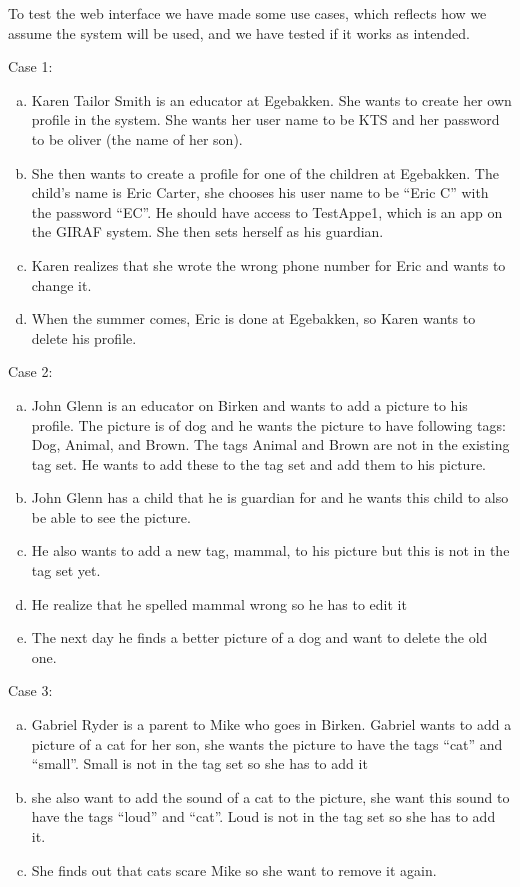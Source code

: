 To test the web interface we have made some use cases, which reflects how we assume the system will be used, and we have tested if it works as intended. 

Case 1:
\begin{enumerate}[(a)]
\item Karen Tailor Smith is an educator at Egebakken. She wants to create her own profile in the system. She wants her user name to be KTS and her password to be oliver (the name of her son).

\item She then wants to create a profile for one of the children at Egebakken. The child's name is Eric Carter, she chooses his user name to be ``Eric C'' with the password ``EC''. He should have access to TestAppe1, which is an app on the GIRAF system. She then sets herself as his guardian.

\item Karen realizes that she wrote the wrong phone number for Eric and wants to change it.

\item When the summer comes, Eric is done at Egebakken, so Karen wants to delete his profile. 
\end{enumerate}
Case 2:
\begin{enumerate}[(a)]
\item John Glenn is an educator on Birken and wants to add a picture to his profile. The picture is of dog and he wants the picture to have following tags: Dog, Animal, and Brown. The tags Animal and Brown are not in the existing tag set. He wants to add these to the tag set and add them to his picture.

\item John Glenn has a child that he is guardian for and he wants this child to also be able to see the picture.

\item He also wants to add a new tag, mammal, to his picture but this is not in the tag set yet. 

\item He realize that he spelled mammal wrong so he has to edit it

\item The next day he finds a better picture of a dog and want to delete the old one.
\end{enumerate}
Case 3:
\begin{enumerate}[(a)]
\item Gabriel Ryder is a parent to Mike who goes in Birken. Gabriel wants to add a picture of a cat for her son, she wants the picture to have the tags ``cat'' and ``small''. Small is not in the tag set so she has to add it

\item she also want to add the sound of a cat to the picture, she want this sound to have the tags ``loud'' and ``cat''. Loud is not in the tag set so she has to add it.

\item She finds out that cats scare Mike so she want to remove it again.
\end{enumerate}

